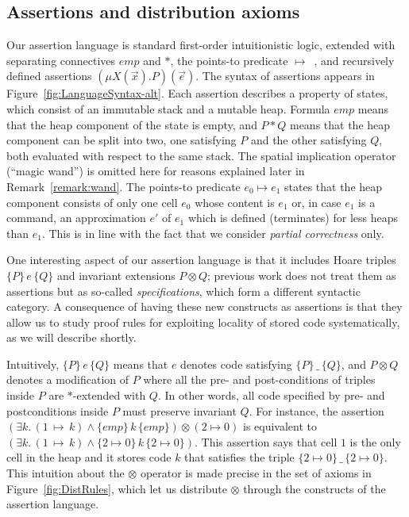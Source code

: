 \documentclass{LMCS}
\theoremstyle{remark}
\newcommand{\triple}[3]{{\ensuremath{\!\left.\{ #1 \}\, #2\, \{  #3 \}\!\right.}}}
\newcommand{\pointsto}{\ensuremath{\mapsto}}
\newcommand{\EMP}{\ensuremath{\textit{emp}}}
\begin{document}
\subsection{Assertions and distribution axioms}

Our assertion language is standard first-order intuitionistic logic,
extended with
separating connectives $\EMP$ and $*$, the points-to predicate 
${\pointsto}$~\cite{Reynolds:02a},
and recursively defined assertions $(\mu X(\vec x).P)(\vec e)$. 
The syntax of assertions appears in Figure~\ref{fig:LanguageSyntax-alt}.
Each assertion describes a property of states, which consist of an immutable stack and 
a mutable heap. Formula $\EMP$ means that the heap component of the state is
empty, and $P*Q$ means that the heap component can be split
into two, one satisfying $P$  and the other satisfying $Q$, both evaluated with respect to the same
stack. The spatial implication operator (``magic wand'') is omitted here for reasons explained
later in Remark~\ref{remark:wand}. The points-to predicate $e_0\pointsto e_1$
states that the heap component consists of only one cell $e_0$ whose 
content is  $e_1$ or, in case $e_1$ is a command, an approximation  $e'$ of $e_1$ which is defined (terminates) 
for less heaps than $e_1$. This is in line with the fact that we consider \emph{partial correctness} only.

One interesting aspect of our assertion language is that it includes Hoare triples 
$\triple{P}{e}{Q}$ and invariant extensions $P\otimes Q$; previous work
\cite{BirkedalL:semslt-lmcs,Birkedal:Reus:Schwinghammer:Yang:08} does not treat them as assertions 
but as so-called \emph{specifications}, which form a different syntactic category. 
A consequence of having these new constructs as assertions
is that they allow us to study proof rules for exploiting locality of stored code
systematically, as we will describe shortly.

Intuitively, $\triple{P}{e}{Q}$ means that $e$ denotes code 
satisfying $\triple{P}{\_}{Q}$, and $P\otimes Q$ denotes a modification of $P$ where 
all the pre- and post-conditions of triples inside $P$ are $*$-extended with $Q$. In other words,
all code specified by pre- and postconditions inside $P$ must preserve  invariant $Q$. For instance,
the assertion
$(\exists k.\, (1\,{\pointsto}\, k) \wedge \triple{\EMP}{k}{\EMP}) \otimes (2{\pointsto}0)$
is equivalent to
$(\exists k.\, (1\,{\pointsto}\, k) \wedge \triple{2{\pointsto}0}{k}{2{\pointsto}0})$.
This assertion says that cell $1$ is the only cell in the heap
and it stores code $k$ that satisfies the triple $\triple{2{\pointsto}0}{\_}{2{\pointsto}0}$.
This intuition about the $\otimes$ operator is made precise in the set of
axioms in Figure~\ref{fig:DistRules}, which let us distribute $\otimes$ through
  the constructs of the assertion language. 
\end{document}
